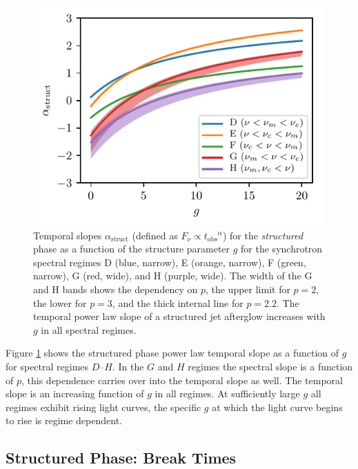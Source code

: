 \documentclass[twocolumn]{aastex62}
\newcommand{\tobs}{\ensuremath{t_{\mathrm{obs}}}}
\begin{document}
\begin{figure}
	\includegraphics[width=\columnwidth]{figs/slopesStruct.pdf}
	\caption{Temporal slopes $\alpha_{\mathrm{struct}}$ (defined as $F_\nu \propto \tobs^{\alpha}$) for the \emph{structured} phase as a function of the structure parameter $g$ for the synchrotron spectral regimes D (blue, narrow), E (orange, narrow),  F (green, narrow), G (red, wide), and H (purple, wide).  The width of the G and H bands shows the dependency on $p$, the upper limit for $p=2$, the lower for $p=3$, and the thick internal line for $p=2.2$. The temporal power law slope of a structured jet afterglow increases with $g$ in all spectral regimes. \label{fig:slopesG}}
\end{figure}

Figure \ref{fig:slopesG} shows the structured phase power law temporal slope as a function of $g$ for spectral regimes $D$--$H$. In the $G$ and $H$ regimes the spectral slope is a function of $p$, this dependence carries over into the temporal slope as well. The temporal slope is an increasing function of $g$ in all regimes.  At sufficiently large $g$ all regimes exhibit rising light curves, the specific $g$ at which the light curve begins to rise is regime dependent.

\subsection{Structured Phase: Break Times}\label{subsec:structureBreak}
\end{document}
